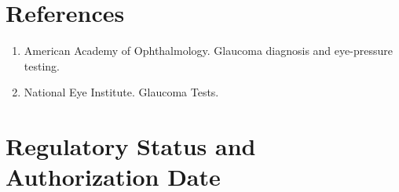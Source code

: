 \section*{References}
\begin{enumerate}
  \item American Academy of Ophthalmology. Glaucoma diagnosis and eye-pressure testing.
  \item National Eye Institute. Glaucoma Tests.
\end{enumerate}

\clearpage


\section*{Regulatory Status and Authorization Date}

\clearpage
